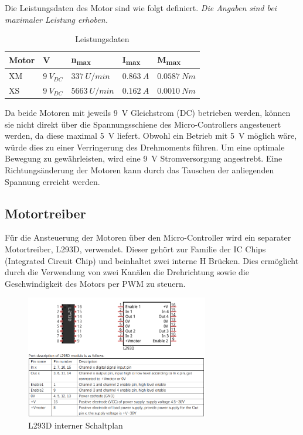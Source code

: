 \documentclass[conference,compsoc,final,a4paper]{IEEEtran}
\begin{document}
\noindent Die Leistungsdaten des Motor sind wie folgt definiert. 
\newline \textit{Die Angaben sind bei maximaler Leistung erhoben.}

\begin{table}[h]
  \caption{Leistungsdaten}
  \label{Leistungsdaten}
  \centering
  \begin{tabular}{lllll}
    \toprule
    \textbf{Motor} & \textbf{V} & \textbf{n\textsubscript{max}} & \textbf{I\textsubscript{max}} & \textbf{M\textsubscript{max}} \\
    \midrule
      XM \autocite{motorenXM} & $\qty{9}{V}_{DC}$ & $\qty{337}{U/min}$ & $\qty{0.863}{A}$ & $\qty{0.0587}{Nm}$ \\ 
      XS \autocite{motorenXS} & $\qty{9}{V}_{DC}$ & $\qty{5663}{U/min}$ & $\qty{0.162}{A}$ & $\qty{0.0010}{Nm}$ \\
    \bottomrule
  \end{tabular}
  \end{table}
  
\noindent Da beide Motoren mit jeweils \qty{9}{V} Gleichstrom (DC) betrieben werden, können sie nicht direkt über die Spannungsschiene des Micro-Controllers angesteuert werden, 
da diese maximal \qty{5}{V} liefert. Obwohl ein Betrieb mit \qty{5}{V} möglich wäre, würde dies zu einer Verringerung des Drehmoments führen. Um eine optimale Bewegung zu gewährleisten, 
wird eine \qty{9}{V} Stromversorgung angestrebt. Eine Richtungsänderung der Motoren kann durch das Tauschen der anliegenden Spannung erreicht werden.  

\subsection{Motortreiber}

Für die Ansteuerung der Motoren über den Micro-Controller wird ein separater Motortreiber, L293D, verwendet.
Dieser gehört zur Familie der IC Chips (Integrated Circuit Chip) und beinhaltet zwei interne H Brücken. Dies ermöglicht durch die Verwendung von zwei Kanälen die Drehrichtung 
sowie die Geschwindigkeit des Motors per PWM  zu steuern.

\begin{figure}[h]
  \centering
\includegraphics[width=8cm]{../images/L293D.png}
\caption{L293D interner Schaltplan \autocite{freenoveTutorial}}\label{Elektrik:L293D}
\end{figure}
\end{document}
